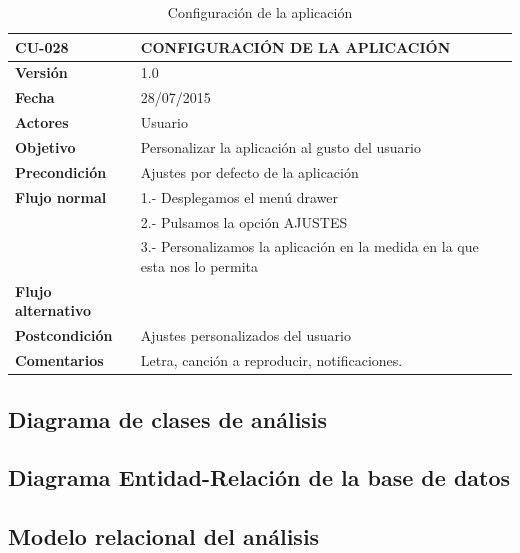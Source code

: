 \documentclass[../pfc.tex]{subfiles}
\begin{document}
	\begin{table}[H]
		\centering
		\begin{tabular}[t]{|p{3cm}|p{9.5cm}|}
			\hline \textbf{CU-028} & \textbf{CONFIGURACIÓN DE LA APLICACIÓN} \\*
			\hline\hline \textbf{Versión} & 1.0 \\*
			\hline\hline \textbf{Fecha} & 28/07/2015 \\*
			\hline\textbf{Actores} 	& Usuario\\*
			\hline \textbf{Objetivo} & Personalizar la aplicación al gusto del usuario\\* 			
			\hline \textbf{Precondición} & Ajustes por defecto de la aplicación\\* 
			\hline \textbf{Flujo normal} & 1.- Desplegamos el menú drawer \\* 
			& 2.- Pulsamos la opción AJUSTES\\*	
			& 3.- Personalizamos la aplicación en la medida en la que esta nos lo permita\\*	
			\hline \textbf{Flujo alternativo} & \\* 
			\hline \textbf{Postcondición} & Ajustes personalizados del usuario\\* 
			\hline \textbf{Comentarios}   & Letra, canción a reproducir, notificaciones.\\*
			\hline
		\end{tabular}
		\caption{Configuración de la aplicación}
		\label{tabla:caso036}
	\end{table}
			


	
	\subsection{Diagrama de clases de análisis}
		
	\subsection{Diagrama Entidad-Relación de la base de datos}
		
	\subsection{Modelo relacional del análisis}
	
\end{document}
